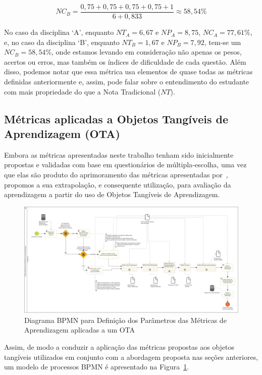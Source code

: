$$NC_B = \frac{0,75 + 0,75 + 0,75 + 0,75 + 1}{6 + 0,833} \approx 58,54\% $$

No caso da disciplina `A', enquanto $NT_A = 6,67$ e $NP_A = 8,75$, $NC_A = 77,61\%$, e, no caso da disciplina `B', enquanto $NT_B=1,67$ e $NP_B=7,92$, tem-se um $NC_B=58,54\%$, onde estamos levando em consideração não apenas os pesos, acertos ou erros, mas também os índices de dificuldade de cada questão. Além disso, podemos notar que essa métrica usa elementos de quase todas as métricas definidas anteriormente e, assim, pode falar sobre o entendimento do estudante com mais propriedade do que a Nota Tradicional ($NT$).

\subsection{Métricas aplicadas a Objetos Tangíveis de Aprendizagem (OTA)}\label{subsec:aplicacao_metricasOFVA}

Embora as métricas apresentadas neste trabalho tenham sido inicialmente propostas e validadas com base em questionários de múltipla-escolha, uma vez que elas são produto do aprimoramento das métricas apresentadas por~\cite{leitao:2017}, propomos a sua extrapolação, e consequente utilização, para avaliação da aprendizagem a partir do uso de Objetos Tangíveis de Aprendizagem. 

\begin{figure}[htb]
	\centering
	\includegraphics[width=1\linewidth]{chapters/proposedMethod/bpmn_metricas.png}
	\caption{Diagrama BPMN para Definição dos Parâmetros das Métricas de Aprendizagem aplicadas a um OTA}
	\label{fig:bpmn_metricas}
\end{figure}

Assim, de modo a conduzir a aplicação das métricas propostas aos objetos tangíveis utilizados em conjunto com a abordagem proposta nas seções anteriores, um modelo de processos BPMN é apresentado na Figura~\ref{fig:bpmn_metricas}.

